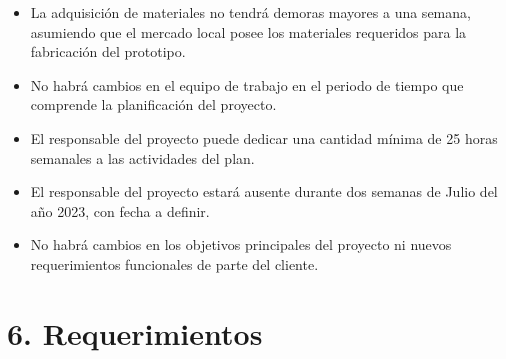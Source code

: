 \documentclass[
11pt, %
codirector, %
]{charter}
\begin{document}
\begin{itemize}
	\item La adquisición de materiales no tendrá demoras mayores a una semana, asumiendo que el mercado local posee los materiales requeridos para la fabricación del prototipo.
	\item No habrá cambios en el equipo de trabajo en el periodo de tiempo que comprende la planificación del proyecto.
	\item El responsable del proyecto puede dedicar una cantidad mínima de 25 horas semanales a las actividades del plan.
	\item El responsable del proyecto estará ausente durante dos semanas de Julio del año 2023, con fecha a definir.
	\item No habrá cambios en los objetivos principales del proyecto ni nuevos requerimientos funcionales de parte del cliente.
\end{itemize}

\section{6. Requerimientos}
\label{sec:requerimientos}
\end{document}

